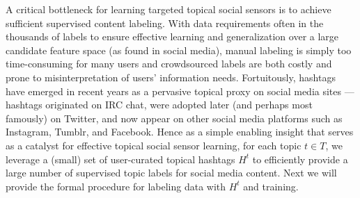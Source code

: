 %
%

A critical bottleneck for learning targeted topical social sensors
is to achieve sufficient supervised content labeling.  With data
requirements often in the thousands of labels to ensure effective
learning and generalization over a large candidate feature space (as
found in social media), manual labeling is simply too time-consuming
for many users and crowdsourced labels are both costly and prone to
misinterpretation of users' information needs.  Fortuitously, hashtags
have emerged in recent years as a pervasive topical proxy on social
media sites --- hashtags originated on IRC chat, were adopted later
(and perhaps most famously) on Twitter, and now appear on other social
media platforms such as Instagram, Tumblr, and Facebook.  Hence as a
simple enabling insight that serves as a catalyst for effective
topical social sensor learning, for each topic $t \in T$, we leverage a (small) set of
user-curated topical hashtags $H^t$ to efficiently provide a large number of
supervised topic labels for social media content.  Next we will provide
the formal procedure for labeling data with $H^t$ and training.

